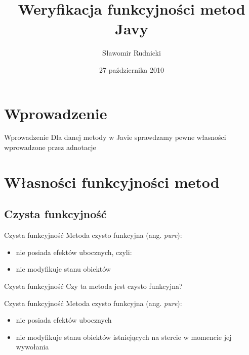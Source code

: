 \documentclass{beamer}
\title{Weryfikacja funkcyjności metod Javy}
\author{Sławomir Rudnicki}
\institute{Niezawodność systemów współbieżnych i obiektowych}
\date{27 października 2010}
\begin{document}
\begin{frame}
  \titlepage
\end{frame}
\begin{frame}
  \tableofcontents[pausesections]
\end{frame}

\setcounter{tocdepth}{2}

\section{Wprowadzenie}

\begin{frame}{Wprowadzenie}
  Dla danej metody w Javie sprawdzamy pewne własności wprowadzone
  przez adnotacje \pause 
\end{frame}

\section{Własności funkcyjności metod}

\subsection{Czysta funkcyjność}

\begin{frame}{Czysta funkcyjność}
  Metoda czysto funkcyjna (ang. \textsl{pure}):
  \begin{itemize}
  \item nie posiada efektów ubocznych, czyli:
  \item nie modyfikuje stanu obiektów
  \end{itemize}
\end{frame}

\begin{frame}{Czysta funkcyjność}
  Czy ta metoda jest czysto funkcyjna?
  
\end{frame}

\begin{frame}{Czysta funkcyjność}
  Metoda czysto funkcyjna (ang. \textsl{pure}):
  \begin{itemize}
  \item nie posiada efektów ubocznych
  \item nie modyfikuje stanu obiektów \alert{istniejących na stercie w momencie jej wywołania}
  \end{itemize}
\end{frame}
\end{document}
